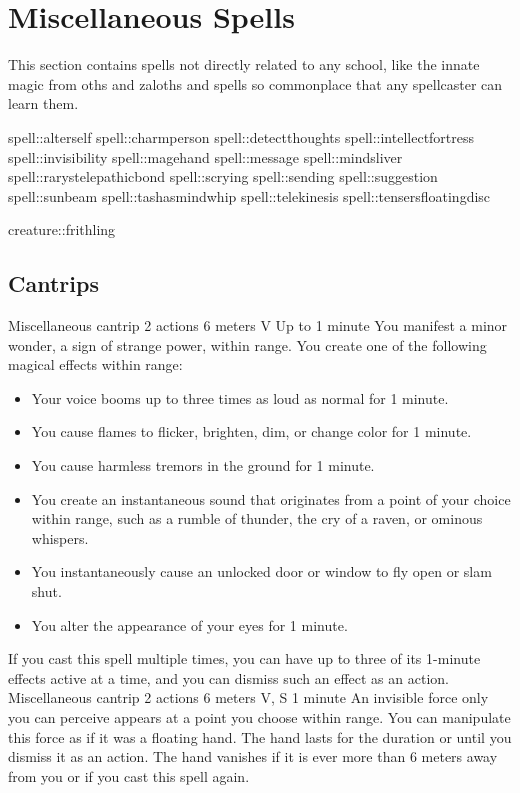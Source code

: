 \section{Miscellaneous Spells}
This section contains spells not directly related to any school, like the innate magic from oths and zaloths and spells so commonplace that any spellcaster can learn them.

spell::alterself
spell::charmperson
spell::detectthoughts
spell::intellectfortress
spell::invisibility
spell::magehand
spell::message
spell::mindsliver
spell::rarystelepathicbond
spell::scrying
spell::sending
spell::suggestion
spell::sunbeam
spell::tashasmindwhip
spell::telekinesis
spell::tensersfloatingdisc

creature::frithling

\subsection*{Cantrips}
        {Miscellaneous cantrip}
        {2 actions}
        {6 meters}
        {V}
        {Up to 1 minute}
        You manifest a minor wonder, a sign of strange power, within range.
        You create one of the following magical effects within range:
        \begin{itemize}
            \item Your voice booms up to three times as loud as normal for 1 minute.
            \item You cause flames to flicker, brighten, dim, or change color for 1 minute.
            \item You cause harmless tremors in the ground for 1 minute.
            \item You create an instantaneous sound that originates from a point of your choice within range, such as a rumble of thunder, the cry of a raven, or ominous whispers.
            \item You instantaneously cause an unlocked door or window to fly open or slam shut.
            \item You alter the appearance of your eyes for 1 minute.
        \end{itemize}
        If you cast this spell multiple times, you can have up to three of its 1-minute effects active at a time, and you can dismiss such an effect as an action.
        {Miscellaneous cantrip}
        {2 actions}
        {6 meters}
        {V, S}
        {1 minute}
        An invisible force only you can perceive appears at a point you choose within range.
        You can manipulate this force as if it was a floating hand.
        The hand lasts for the duration or until you dismiss it as an action.
        The hand vanishes if it is ever more than 6 meters away from you or if you cast this spell again.

